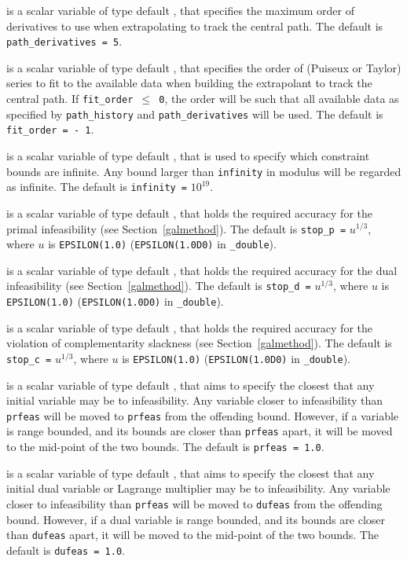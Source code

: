 \begin{description}
 is a scalar variable of type default \integer, that 
specifies the maximum order of derivatives to use when extrapolating
to track the central path.
The default is {\tt path\_derivatives = 5}.

 is a scalar variable of type default \integer, that 
specifies the order of (Puiseux or Taylor) series to fit to the available data 
when building the extrapolant to track the central path. If {\tt fit\_order
$\leq$ 0}, the order will be such that all available data as specified by
{\tt path\_history} and {\tt path\_derivatives} will be used.
The default is {\tt fit\_order = - 1}.

 is a scalar variable of type default \realdp, that is used to
specify which constraint bounds are infinite.
Any bound larger than {\tt infinity} in modulus will be regarded as infinite.
The default is {\tt infinity =} $10^{19}$.

 is a scalar variable of type default \realdp, that holds the
required accuracy for the primal infeasibility (see Section~\ref{galmethod}).
The default is {\tt stop\_p =} $u^{1/3}$,
where $u$ is {\tt EPSILON(1.0)} ({\tt EPSILON(1.0D0)} in 
{\tt \fullpackagename\_double}).

 is a scalar variable of type default 
\realdp, that holds the
required accuracy for the dual infeasibility (see Section~\ref{galmethod}).
The default is {\tt stop\_d =} $u^{1/3}$,
where $u$ is {\tt EPSILON(1.0)} ({\tt EPSILON(1.0D0)} in 
{\tt \fullpackagename\_double}).

 is a scalar variable of type default 
\realdp, that holds the
required accuracy for the violation of complementarity slackness 
(see Section~\ref{galmethod}).
The default is {\tt stop\_c =} $u^{1/3}$,
where $u$ is {\tt EPSILON(1.0)} ({\tt EPSILON(1.0D0)} in 
{\tt \fullpackagename\_double}).

 is a scalar variable of type default \realdp, that aims to specify
the closest that any initial variable may be to infeasibility. Any variable
closer to infeasibility than {\tt prfeas} will be moved to {\tt prfeas} from 
the offending bound. However, if a variable is range bounded, and its bounds 
are closer than {\tt prfeas} apart, it will be moved to the mid-point of the 
two bounds.
The default is {\tt prfeas = 1.0}.

 is a scalar variable of type default \realdp, that aims to specify
the closest that any initial dual variable or Lagrange multiplier may be to 
infeasibility. Any variable closer to infeasibility than {\tt prfeas} will be
moved to {\tt dufeas} from the offending bound. However, if a dual variable
is range bounded, and its bounds are closer than {\tt dufeas} apart, it will
be moved to the mid-point of the two bounds.
The default is {\tt dufeas = 1.0}.


\end{description}
